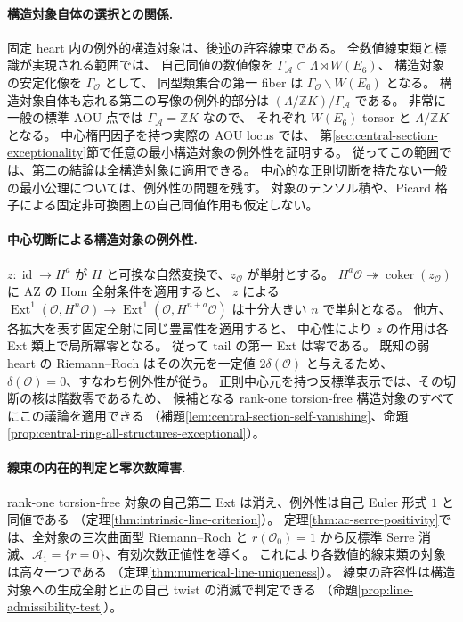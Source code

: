 \documentclass[11pt,a4paper]{ltjsarticle}
\theoremstyle{definition}\newtheorem{remark}[theorem]{注意}
\newcommand{\Ext}{\operatorname{Ext}}\newcommand{\Extop}{\operatorname{Ext}}
\newcommand{\OO}{\mathcal O}\newcommand{\rank}{\operatorname{rank}}
\begin{document}
\paragraph{構造対象自体の選択との関係.}
固定 heart 内の例外的構造対象は、後述の許容線束である。
全数値線束類と標識が実現される範囲では、
自己同値の数値像を $\Gamma_{\mathcal A}\subset\Lambda\rtimes W(E_6)$、
構造対象の安定化像を $\Gamma_{\OO}$ として、
同型類集合の第一 fiber は $\Gamma_{\OO}\backslash W(E_6)$ となる。
構造対象自体も忘れる第二の写像の例外的部分は
$(\Lambda/\mathbb ZK)/\overline\Gamma_{\mathcal A}$ である。
非常に一般の標準 AOU 点では $\Gamma_{\mathcal A}=\mathbb ZK$ なので、
それぞれ $W(E_6)$-torsor と $\Lambda/\mathbb ZK$ となる。
中心楕円因子を持つ実際の AOU locus では、
第\ref{sec:central-section-exceptionality}節で任意の最小構造対象の例外性を証明する。
従ってこの範囲では、第二の結論は全構造対象に適用できる。
中心的な正則切断を持たない一般の最小公理については、例外性の問題を残す。
対象のテンソル積や、Picard 格子による固定非可換圏上の自己同値作用も仮定しない。

\paragraph{中心切断による構造対象の例外性.}
$z:\operatorname{id}\to H^a$ が $H$ と可換な自然変換で、$z_{\OO}$ が単射とする。
$H^a\OO\twoheadrightarrow\operatorname{coker}(z_{\OO})$ に AZ の Hom 全射条件を適用すると、
$z$ による $\Ext^1(\OO,H^n\OO)\to\Ext^1(\OO,H^{n+a}\OO)$ は十分大きい $n$ で単射となる。
他方、各拡大を表す固定全射に同じ豊富性を適用すると、
中心性により $z$ の作用は各 Ext 類上で局所冪零となる。
従って tail の第一 Ext は零である。
既知の弱 heart の Riemann--Roch はその次元を一定値 $2\delta(\OO)$ と与えるため、
$\delta(\OO)=0$、すなわち例外性が従う。
正則中心元を持つ反標準表示では、その切断の核は階数零であるため、
候補となる rank-one torsion-free 構造対象のすべてにこの議論を適用できる
（補題\ref{lem:central-section-self-vanishing}、命題\ref{prop:central-ring-all-structures-exceptional}）。

\paragraph{線束の内在的判定と零次数障害.}
rank-one torsion-free 対象の自己第二 Ext は消え、例外性は自己 Euler 形式 $1$ と同値である
（定理\ref{thm:intrinsic-line-criterion}）。
定理\ref{thm:ac-serre-positivity}では、全対象の三次曲面型 Riemann--Roch と
$r(\OO_0)=1$ から反標準 Serre 消滅、$\mathcal A_1=\{r=0\}$、有効次数正値性を導く。
これにより各数値的線束類の対象は高々一つである
（定理\ref{thm:numerical-line-uniqueness}）。
線束の許容性は構造対象への生成全射と正の自己 twist の消滅で判定できる
（命題\ref{prop:line-admissibility-test}）。
\end{document}
